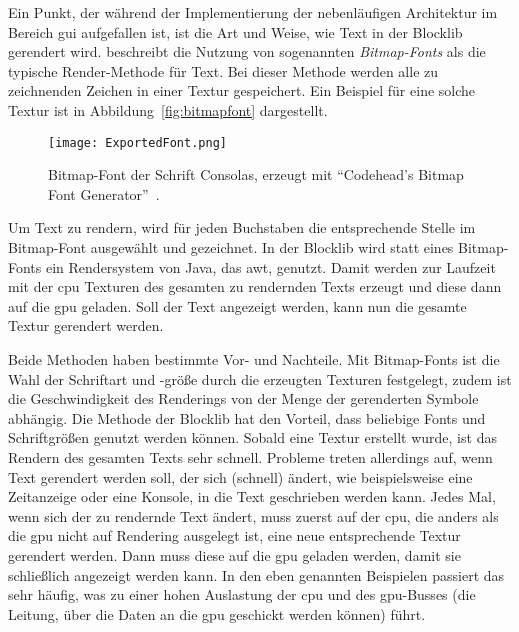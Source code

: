 Ein Punkt, der während der Implementierung der nebenläufigen Architektur im Bereich \ac{gui} aufgefallen ist, ist die Art und Weise, wie Text in der Blocklib gerendert wird. \textcite{Vries2020} beschreibt die Nutzung von sogenannten \emph{Bitmap-Fonts} als die typische Render-Methode für Text. Bei dieser Methode werden alle zu zeichnenden Zeichen in einer Textur gespeichert. Ein Beispiel für eine solche Textur ist in Abbildung~\vref{fig:bitmapfont} dargestellt.
\begin{figure}[!htbp]
	\centering
	\texttt{[image: ExportedFont.png]}
	\caption[Bitmap-Font der Schrift Consolas.]{Bitmap-Font der Schrift Consolas, erzeugt mit \enquote{Codehead's Bitmap Font Generator}~\cite{Codehead2015}.}\label{fig:bitmapfont}
\end{figure}
Um Text zu rendern, wird für jeden Buchstaben die entsprechende Stelle im Bitmap-Font ausgewählt und gezeichnet. In der Blocklib wird statt eines Bitmap-Fonts ein Rendersystem von Java, das \ac{awt}, genutzt. Damit werden zur Laufzeit mit der \ac{cpu} Texturen des gesamten zu rendernden Texts erzeugt und diese dann auf die \ac{gpu} geladen. Soll der Text angezeigt werden, kann nun die gesamte Textur gerendert werden.

Beide Methoden haben bestimmte Vor- und Nachteile. Mit Bitmap-Fonts ist die Wahl der Schriftart und -größe durch die erzeugten Texturen festgelegt, zudem ist die Geschwindigkeit des Renderings von der Menge der gerenderten Symbole abhängig. Die Methode der Blocklib hat den Vorteil, dass beliebige Fonts und Schriftgrößen genutzt werden können. Sobald eine Textur erstellt wurde, ist das Rendern des gesamten Texts sehr schnell. Probleme treten allerdings auf, wenn Text gerendert werden soll, der sich (schnell) ändert, wie beispielsweise eine Zeitanzeige oder eine Konsole, in die Text geschrieben werden kann. Jedes Mal, wenn sich der zu rendernde Text ändert, muss zuerst auf der \ac{cpu}, die anders als die \ac{gpu} nicht auf Rendering ausgelegt ist, eine neue entsprechende Textur gerendert werden. Dann muss diese auf die \ac{gpu} geladen werden, damit sie schließlich angezeigt werden kann. In den eben genannten Beispielen passiert das sehr häufig, was zu einer hohen Auslastung der \ac{cpu} und des \ac{gpu}-Busses (die Leitung, über die Daten an die \ac{gpu} geschickt werden können) führt.

